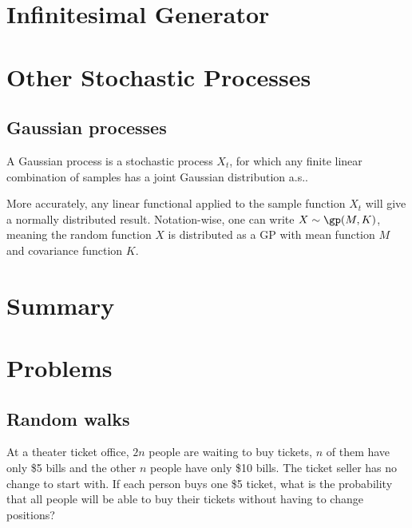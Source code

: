 
\section{Infinitesimal Generator}

\section{Other Stochastic Processes}

\subsection{Gaussian processes}

\begin{definition}\label{def:gaussian_process}
A Gaussian process is a stochastic process $X_t$, for which any finite linear combination of samples has a joint Gaussian distribution a.s..

More accurately, any linear functional applied to the sample function $X_t$ will give a normally distributed result. Notation-wise, one can write $X \sim \gp(M,K)$, meaning the random function $X$ is distributed as a GP with mean function $M$ and covariance function $K$.
\end{definition}



\section{Summary}

\section{Problems}

\subsection{Random walks}

\begin{problem}\label{exe:ticket_line}
At a theater ticket office, $2n$ people are waiting to buy tickets, $n$ of them have only \$5 bills and the other $n$ people have only \$10 bills. The ticket seller has no change to start with. If
each person buys one \$5 ticket, what is the probability that all people will be able to buy their tickets without having to change positions?
\end{problem}

